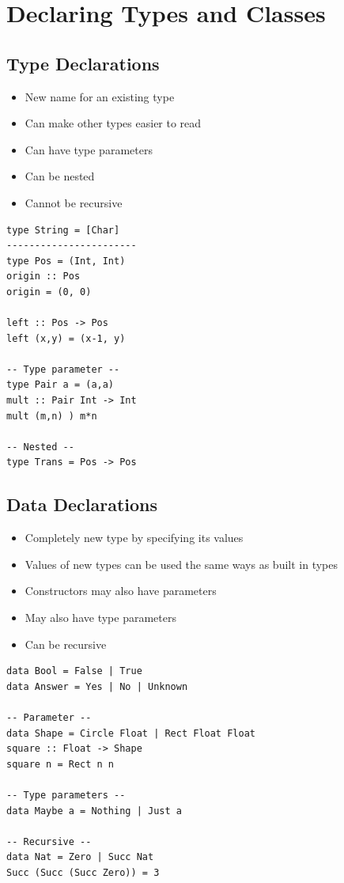 
\section{Declaring Types and Classes}
\subsection{Type Declarations}
\begin{itemize}
    \item New name for an existing type
    \item Can make other types easier to read
    \item Can have type parameters
    \item Can be nested
    \item Cannot be recursive
\end{itemize}
\begin{lstlisting}
type String = [Char]
-----------------------
type Pos = (Int, Int)
origin :: Pos
origin = (0, 0)

left :: Pos -> Pos
left (x,y) = (x-1, y)

-- Type parameter --
type Pair a = (a,a)
mult :: Pair Int -> Int
mult (m,n) ) m*n

-- Nested --
type Trans = Pos -> Pos
\end{lstlisting}

\subsection{Data Declarations}
\begin{itemize}
    \item Completely new type by specifying its values
    \item Values of new types can be used the same ways as built in types
    \item Constructors may also have parameters
    \item May also have type parameters
    \item Can be recursive
\end{itemize}
\begin{lstlisting}
data Bool = False | True
data Answer = Yes | No | Unknown

-- Parameter --
data Shape = Circle Float | Rect Float Float
square :: Float -> Shape
square n = Rect n n

-- Type parameters --
data Maybe a = Nothing | Just a

-- Recursive --
data Nat = Zero | Succ Nat
Succ (Succ (Succ Zero)) = 3
\end{lstlisting}

